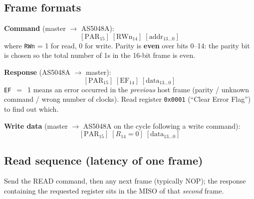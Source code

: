 \documentclass[11pt,a4paper]{article}
\begin{document}
\subsection{Frame formats}

\textbf{Command} (master $\to$ AS5048A):
\[
\boxed{\,[\text{PAR}_{15}] \;[\text{RWn}_{14}] \;[\text{addr}_{13\ldots 0}]\,}
\]
where \texttt{RWn} = 1 for read, 0 for write.  Parity is \textbf{even}
over bits 0--14: the parity bit is chosen so the total number of 1s in
the 16-bit frame is even.

\textbf{Response} (AS5048A $\to$ master):
\[
\boxed{\,[\text{PAR}_{15}] \;[\text{EF}_{14}] \;[\text{data}_{13\ldots 0}]\,}
\]
\texttt{EF}~$=$~1 means an error occurred in the \emph{previous} host
frame (parity / unknown command / wrong number of clocks).  Read
register \texttt{0x0001} (``Clear Error Flag'') to find out which.

\textbf{Write data} (master $\to$ AS5048A on the cycle following a
write command):
\[
\boxed{\,[\text{PAR}_{15}] \;[R_{14}=0] \;[\text{data}_{13\ldots 0}]\,}
\]

\subsection{Read sequence (latency of one frame)}
\begin{center}
\end{center}

\noindent Send the READ command, then any next frame (typically NOP);
the response containing the requested register sits in the MISO of that
\emph{second} frame.
\end{document}
